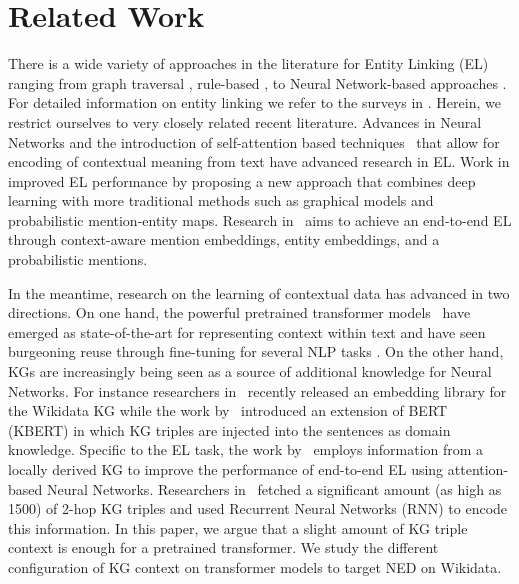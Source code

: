 \documentclass[sigconf, superscriptaddress]{acmart}
\begin{document}
\section{Related Work}
\label{sect:related-work}


There is a wide variety of approaches in the literature for Entity Linking (EL) ranging from graph traversal \cite{UsbeckNRGCAB14}, rule-based \cite{sakor2019old}, to Neural Network-based approaches \cite{kolitsas-etal-2018-end,Mulang2019ContextawareEL}.
For detailed information on entity linking we refer to the surveys in \cite{Survey-shen-et-al,Balog2018}. Herein, we restrict ourselves to very closely related recent literature. Advances in Neural Networks and the introduction of self-attention based techniques~\cite{Attention-DBLP:journals/corr/VaswaniSPUJGKP17} that allow for encoding of contextual meaning from text have advanced research in EL. Work in \cite{DBLP:conf/emnlp/GaneaH17} improved EL performance by proposing a new approach that combines deep learning with more traditional methods such as graphical models and probabilistic mention-entity maps. Research in~\cite{kolitsas-etal-2018-end} aims to achieve an end-to-end EL through context-aware mention embeddings, entity embeddings, and a probabilistic mentions.


In the meantime, research on the learning of contextual data has advanced in two directions. On one hand, the powerful pretrained transformer models~\cite{RoBERTa-DBLP:journals/corr/abs-1907-11692,XLNet-DBLP:journals/corr/abs-1906-08237} have emerged as state-of-the-art for representing context within text and have seen burgeoning reuse through fine-tuning for several NLP tasks \cite{DBLP:journals/corr/abs-2001-01447}. On the other hand, KGs are increasingly being seen as a source of additional knowledge for Neural Networks. For instance researchers in~\cite{BigGraph-DBLP:journals/corr/abs-1903-12287} recently released an embedding library for the Wikidata KG while the work by~\cite{Liu2019KBERTEL} introduced an extension of BERT (KBERT) in which KG triples are injected into the sentences as domain knowledge. Specific to the EL task, the work by~\cite{Mulang2019ContextawareEL} employs information from a locally derived KG to improve the performance of end-to-end EL using attention-based Neural Networks. Researchers in~\cite{cetoli2019neural} fetched a significant amount (as high as 1500) of 2-hop KG triples and used Recurrent Neural Networks (RNN) to encode this information. In this paper, we argue that a slight amount of KG triple context is enough for a pretrained transformer. We study the different configuration of KG context on transformer models to target NED on Wikidata.
\end{document}
